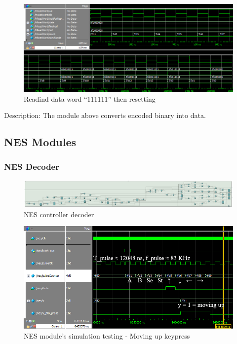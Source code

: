 \documentclass[12pt]{article}
\numberwithin{figure}{subsection}
\begin{document}
\begin{figure}[ht]
  \centering
  \includegraphics[width=\textwidth]{ir_simulation_readword.png}
  \caption{Readind data word ``111111'' then resetting}
  \label{fig:ir_simulation_readword}
\end{figure}

Description: The module above converts encoded binary into data.

\newpage

\subsection{NES Modules}

\subsubsection{NES Decoder}

\begin{figure}[ht]
  \centering
  \includegraphics[width=\textwidth]{nes.jpg}
  \caption{NES controller decoder}
  \label{fig:nes}
\end{figure}

\begin{figure}[ht]
  \centering
  \includegraphics[width=\textwidth]{nes_simulation_moving_up.png}
  \caption{NES module’s simulation testing - Moving up keypress}
  \label{fig:nes_simulation_moving_up}
\end{figure}
\end{document}
